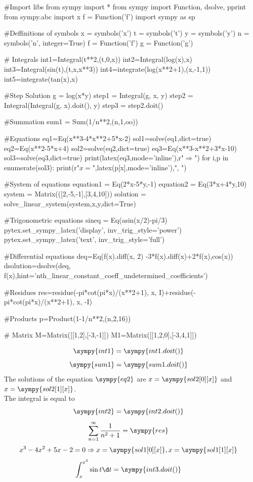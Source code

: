 \documentclass[a4paper,11pt]{article}
\begin{document}
\begin{sympycode}
#Import libs
from sympy import *
from sympy import Function, dsolve, pprint
from sympy.abc import x
f = Function('f')
import sympy as sp

#Deffinitions of symbols
x = symbols('x')
t = symbols('t')
y = symbols('y')
n = symbols('n', integer=True)
f = Function('f')
g = Function('g')

# Integrals
int1=Integral(t**2,(t,0,x))
int2=Integral(log(x),x)
int3=Integral(sin(t),(t,x,x**3))
int4=integrate(log(x**2+1),(x,-1,1))
int5=integrate(tan(x),x)



#Step Solution
g = log(x*y)
step1 = Integral(g, x, y)
step2 = Integral(Integral(g, x).doit(), y)
step3 = step2.doit()

#Summation
sum1 = Sum(1/n**2,(n,1,oo))

#Equations
eq1=Eq(x**3-4*x**2+5*x-2)
sol1=solve(eq1,dict=true)
eq2=Eq(x**2-5*x+4)
sol2=solve(eq2,dict=true)
eq3=Eq(x**3-x**2+3*x-10)
sol3=solve(eq3,dict=true)
print(latex(eq3,mode='inline'),r"$ \Rightarrow $")
for i,p in enumerate(sol3):
	print(r"$ x= $",latex(p[x],mode='inline'),", ")

#System of equations
equation1 = Eq(2*x-5*y,-1)
equation2 = Eq(3*x+4*y,10)
system = Matrix(([2,-5,-1],[3,4,10]))
solution = solve_linear_system(system,x,y,dict=True)

#Trigonometric equations
sineq = Eq(asin(x/2)-pi/3)
pytex.set_sympy_latex('display',
inv_trig_style='power')
pytex.set_sympy_latex('text',
inv_trig_style='full')

#Differential equations
deq=Eq(f(x).diff(x, 2) -3*f(x).diff(x)+2*f(x),cos(x))
dsolution=dsolve(deq, f(x),hint='nth_linear_constant_coeff_undetermined_coefficients')

#Residues
res=residue(-pi*cot(pi*x)/(x**2+1), x, I)+residue(-pi*cot(pi*x)/(x**2+1), x, -I)

#Products
p=Product(1-1/n**2,(n,2,16))

# Matrix
M=Matrix([[1,2],[-3,-1]])
M1=Matrix([[1,2,0],[-3,4,1]])
\end{sympycode}
\[ \sympy{int1}=\sympy{int1.doit()} \]
\[ \sympy{sum1}=\sympy{sum1.doit()} \]
The solutions of the equation $ \sympy{eq2} $ are $ x=\sympy{sol2[0][x]} $ and $ x=\sympy{sol2[1][x]} $.\\
The integral is equal to \[ \sympy{int2}=\sympy{int2.doit()} \]
\[ \sum_{n=1}^{\infty}{\frac{1}{n^2+1}}=\sympy{res} \]
\[ x^3-4x^2+5x-2=0\Rightarrow x=\sympy{sol1[0][x]},x=\sympy{sol1[1][x]} \]
\[ \int_{x}^{x^3}{\sin{t}\d t}=\sympy{int3.doit()} \]
\end{document}
